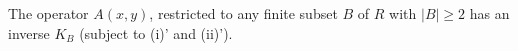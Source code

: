 The operator $A(x,y)$, restricted to any finite subset $B$ of $R$ with $|B| \geq 2$ has an inverse $K_B$ (subject to (i)' and (ii)').